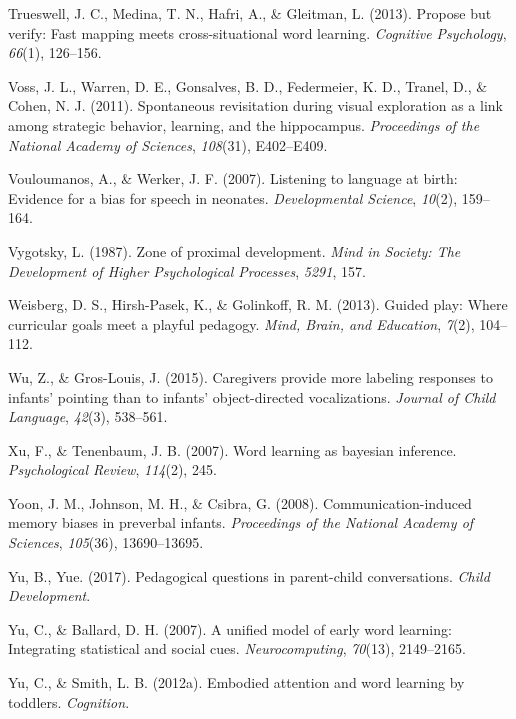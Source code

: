 \documentclass[english,man]{apa6}
\theoremstyle{definition}
\theoremstyle{definition}
\theoremstyle{definition}
\theoremstyle{remark}
\begin{document}
\hypertarget{ref-trueswell2013propose}{}
Trueswell, J. C., Medina, T. N., Hafri, A., \& Gleitman, L. (2013).
Propose but verify: Fast mapping meets cross-situational word learning.
\emph{Cognitive Psychology}, \emph{66}(1), 126--156.

\hypertarget{ref-voss2011spontaneous}{}
Voss, J. L., Warren, D. E., Gonsalves, B. D., Federmeier, K. D., Tranel,
D., \& Cohen, N. J. (2011). Spontaneous revisitation during visual
exploration as a link among strategic behavior, learning, and the
hippocampus. \emph{Proceedings of the National Academy of Sciences},
\emph{108}(31), E402--E409.

\hypertarget{ref-vouloumanos2007listening}{}
Vouloumanos, A., \& Werker, J. F. (2007). Listening to language at
birth: Evidence for a bias for speech in neonates. \emph{Developmental
Science}, \emph{10}(2), 159--164.

\hypertarget{ref-vygotsky1987zone}{}
Vygotsky, L. (1987). Zone of proximal development. \emph{Mind in
Society: The Development of Higher Psychological Processes},
\emph{5291}, 157.

\hypertarget{ref-weisberg2013guided}{}
Weisberg, D. S., Hirsh-Pasek, K., \& Golinkoff, R. M. (2013). Guided
play: Where curricular goals meet a playful pedagogy. \emph{Mind, Brain,
and Education}, \emph{7}(2), 104--112.

\hypertarget{ref-wu2015caregivers}{}
Wu, Z., \& Gros-Louis, J. (2015). Caregivers provide more labeling
responses to infants' pointing than to infants' object-directed
vocalizations. \emph{Journal of Child Language}, \emph{42}(3), 538--561.

\hypertarget{ref-xu2007word}{}
Xu, F., \& Tenenbaum, J. B. (2007). Word learning as bayesian inference.
\emph{Psychological Review}, \emph{114}(2), 245.

\hypertarget{ref-yoon2008communication}{}
Yoon, J. M., Johnson, M. H., \& Csibra, G. (2008). Communication-induced
memory biases in preverbal infants. \emph{Proceedings of the National
Academy of Sciences}, \emph{105}(36), 13690--13695.

\hypertarget{ref-yu2017peagogical}{}
Yu, B., Yue. (2017). Pedagogical questions in parent-child
conversations. \emph{Child Development}.

\hypertarget{ref-yu2007unified}{}
Yu, C., \& Ballard, D. H. (2007). A unified model of early word
learning: Integrating statistical and social cues.
\emph{Neurocomputing}, \emph{70}(13), 2149--2165.

\hypertarget{ref-yu2012embodied}{}
Yu, C., \& Smith, L. B. (2012a). Embodied attention and word learning by
toddlers. \emph{Cognition}.
\end{document}
